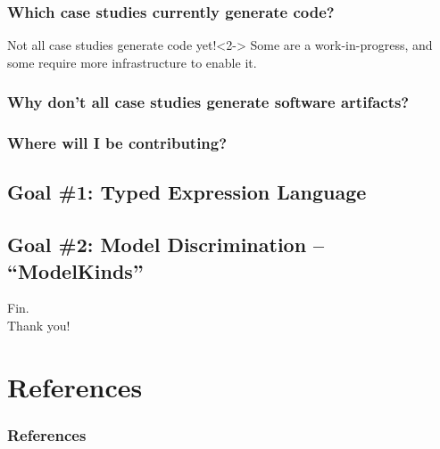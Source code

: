 \documentclass{beamer}
\begin{document}
\begin{frame}
    \frametitle{Which case studies currently generate code?}
    \begin{alertblock}{\footnotesize Not all case studies generate code yet!}<2->
        {\tiny Some are a work-in-progress, and some require more infrastructure to enable it.}
    \end{alertblock}
    
\end{frame}

\begin{frame}
    \frametitle{Why don't all case studies generate software artifacts?}
    
\end{frame}

\begin{frame}
    \frametitle{Where will I be contributing?}
\end{frame}

\subsection{Goal \#1: Typed Expression Language}

\subsection{Goal \#2: Model Discrimination -- ``ModelKinds''}



\begin{frame}
    \center
    \huge{Fin.}\\
    \normalsize{Thank you!}
\end{frame}


\section{References}

\begin{frame}[allowframebreaks]
    \frametitle{References}

    
    
\end{frame}
\end{document}
